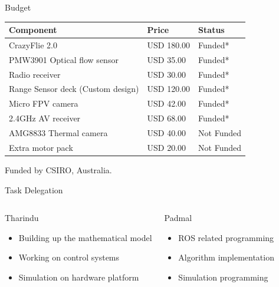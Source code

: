\documentclass[xcolor=table]{beamer}
\begin{document}
\begin{frame}{Budget}
  \begin{footnotesize}
  \begin{center}
  \setlength{\arrayrulewidth}{0.2mm}
  \setlength{\tabcolsep}{5pt}
  \renewcommand{\arraystretch}{1.2}
 
  \begin{tabular}{ |p{3.55cm}|p{3.55cm}|p{3.55cm}| }
  \hline
  \textbf{Component}&\textbf{Price}&\textbf{Status}\\
  \hline
  CrazyFlie 2.0 & USD 180.00 & Funded*\\
  \hline
  PMW3901 Optical flow sensor & USD 35.00 & Funded*\\
  \hline
  Radio receiver & USD 30.00 & Funded*\\
  \hline
  Range Sensor deck (Custom design) & USD 120.00 & Funded*\\
  \hline
  Micro FPV camera & USD 42.00 & Funded*\\
  \hline
  2.4GHz AV receiver & USD 68.00 & Funded*\\
  \hline
  AMG8833 Thermal camera & USD 40.00 & Not Funded\\
  \hline
  Extra motor pack & USD 20.00 & Not Funded\\
  \hline
  \end{tabular}
  \end{center}
  \end{footnotesize}
 \begin{flushright}
 {\small  *Funded by CSIRO, Australia.}
 \end{flushright}
\end{frame}

\begin{frame}{Task Delegation}

  \begin{columns}
  \begin{block}{Tharindu} 
  \begin{itemize}
  \item Building up the mathematical model
  \item Working on control systems
  \item Simulation on hardware platform
  \end{itemize}
  \end{block}
  
  \begin{block}{Padmal} 
  \begin{itemize}
  \item ROS related programming
  \item Algorithm implementation
  \item Simulation programming
  \end{itemize}
  \end{block}
  \end{columns} 
\end{frame}
\end{document}
